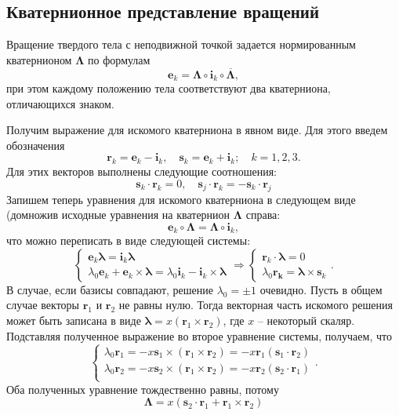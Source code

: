 \documentclass{article}
\begin{document}
\subsection{Кватернионное представление вращений}
Вращение твердого тела с неподвижной точкой задается нормированным
кватернионом $\mathbf{\Lambda}$ по формулам
$$
\mathbf{e}_k =
\mathbf{\Lambda}\circ\mathbf{i}_k\circ\overline{\mathbf{\Lambda}},
$$
при этом каждому положению тела соответствуют два кватерниона, отличающихся
знаком.

Получим выражение для искомого кватерниона в явном виде. Для этого введем
обозначения
$$
\mathbf{r}_k = \mathbf{e}_k - \mathbf{i}_k,\quad \mathbf{s}_k = \mathbf{e}_k +
\mathbf{i}_k ;\quad k=1, 2, 3.
$$
Для этих векторов выполнены следующие соотношения:
$$
\mathbf{s}_k\cdot\mathbf{r}_k = 0, \quad \mathbf{s}_j\cdot\mathbf{r}_k =
-\mathbf{s}_k\cdot\mathbf{r}_j
$$
Запишем теперь уравнения для искомого кватерниона в следующем виде (домножив
исходные уравнения на кватернион $\mathbf{\Lambda}$ справа:
$$
\mathbf{e}_k\circ\mathbf{\Lambda} = \mathbf{\Lambda}\circ\mathbf{i}_k,
$$
что можно переписать в виде следующей системы:
$$
\left\{
\begin{array}{l}
    \mathbf{e}_k\mathbf{\lambda} = \mathbf{i}_k\mathbf{\lambda} \\
    \lambda_0\mathbf{e}_k + \mathbf{e}_k\times\mathbf{\lambda} =
    \lambda_0\mathbf{i}_k - \mathbf{i}_k\times\mathbf{\lambda}
\end{array}
\right. \Rightarrow
\left\{
\begin{array}{l}
    \mathbf{r}_k\cdot\mathbf{\lambda} = 0 \\
    \lambda_0\mathbf{r_k} = \mathbf{\lambda}\times\mathbf{s}_k
\end{array}
\right. .
$$
В случае, если базисы совпадают, решение $\lambda_0=\pm 1$ очевидно. Пусть в
общем случае векторы $\mathbf{r}_1$ и $\mathbf{r}_2$ не равны нулю. Тогда
векторная часть искомого решения может быть записана в виде $\mathbf{\lambda}
= x\left(\mathbf{r}_1\times\mathbf{r}_2\right)$, где $x$ -- некоторый скаляр.
Подставляя полученное выражение во второе уравнение системы, получаем, что
$$
\left\{
\begin{array}{l}
    \lambda_0\mathbf{r}_1 =
    -x\mathbf{s}_1\times\left(\mathbf{r}_1\times\mathbf{r}_2\right)
    =-x\mathbf{r}_1\left(\mathbf{s}_1\cdot\mathbf{r}_2\right)\\
    \lambda_0\mathbf{r}_2 =
    -x\mathbf{s}_2\times\left(\mathbf{r}_1\times\mathbf{r}_2\right)
    =-x\mathbf{r}_2\left(\mathbf{s}_2\cdot\mathbf{r}_1\right)\\
\end{array}
\right. .
$$
Оба полученных уравнение тождественно равны, потому
$$
\mathbf{\Lambda} = x\left(\mathbf{s}_2\cdot\mathbf{r}_1 +
\mathbf{r}_1\times\mathbf{r}_2\right)
$$
\end{document}
